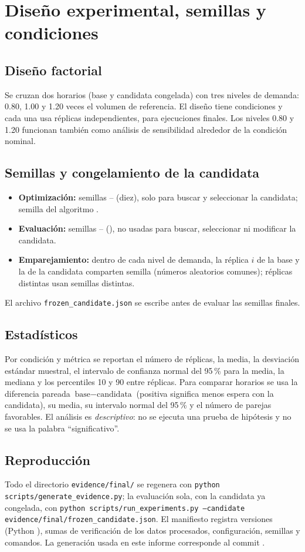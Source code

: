 \section{Diseño experimental, semillas y condiciones}
\label{sec:diseno}

\subsection{Diseño factorial}
Se cruzan dos horarios (base y candidata congelada) con tres niveles de demanda:
0.80, 1.00 y 1.20 veces el volumen de referencia. El diseño tiene \NConditions{} condiciones
y cada una usa \NReps{} réplicas independientes, para \NRuns{} ejecuciones finales. Los
niveles 0.80 y 1.20 funcionan también como análisis de sensibilidad alrededor de la
condición nominal.

\subsection{Semillas y congelamiento de la candidata}
\begin{itemize}
  \item \textbf{Optimización:} semillas \OptSeedFirst--\OptSeedLast{} (diez), solo para
  buscar y seleccionar la candidata; semilla del algoritmo \AlgSeed.
  \item \textbf{Evaluación:} semillas \EvalSeedFirst--\EvalSeedLast{} (\NReps{}), no usadas
  para buscar, seleccionar ni modificar la candidata.
  \item \textbf{Emparejamiento:} dentro de cada nivel de demanda, la réplica $i$ de la base y
  la de la candidata comparten semilla (números aleatorios comunes); réplicas distintas usan
  semillas distintas.
\end{itemize}
El archivo \texttt{frozen\_candidate.json} se escribe antes de evaluar las semillas finales.

\subsection{Estadísticos}
Por condición y métrica se reportan el número de réplicas, la media, la desviación estándar
muestral, el intervalo de confianza normal del 95\,\% para la media, la mediana y los
percentiles 10 y 90 entre réplicas. Para comparar horarios se usa la diferencia pareada
$\text{base}-\text{candidata}$ (positiva significa menos espera con la candidata), su media,
su intervalo normal del 95\,\% y el número de parejas favorables. El análisis es
\emph{descriptivo}: no se ejecuta una prueba de hipótesis y no se usa la palabra
``significativo''.

\subsection{Reproducción}
Todo el directorio \texttt{evidence/final/} se regenera con
\texttt{python scripts/generate\_evidence.py}; la evaluación sola, con la candidata ya
congelada, con \texttt{python scripts/run\_experiments.py --candidate
evidence/final/frozen\_candidate.json}. El manifiesto registra versiones
(Python \PythonVersion), sumas de verificación de los datos procesados, configuración,
semillas y comandos. La generación usada en este informe corresponde al commit
\texttt{\GitCommit}.
